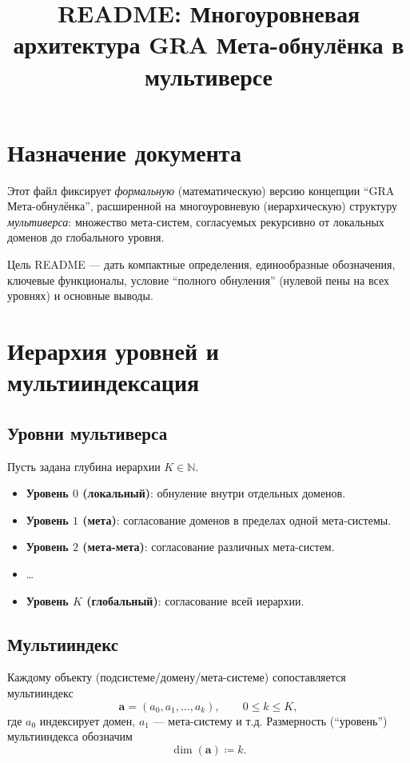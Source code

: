 \documentclass[11pt]{article}
\title{README: Многоуровневая архитектура GRA Мета-обнулёнка в мультиверсе}
\author{}
\date{}
\begin{document}
\maketitle

\section{Назначение документа}

Этот файл фиксирует \emph{формальную} (математическую) версию концепции ``GRA Мета-обнулёнка'', расширенной на многоуровневую (иерархическую) структуру \emph{мультиверса}: множество мета-систем, согласуемых рекурсивно от локальных доменов до глобального уровня.

Цель README --- дать компактные определения, единообразные обозначения, ключевые функционалы, условие ``полного обнуления'' (нулевой пены на всех уровнях) и основные выводы.

\section{Иерархия уровней и мультииндексация}

\subsection{Уровни мультиверса}

Пусть задана глубина иерархии $K\in\mathbb{N}$.

\begin{itemize}[leftmargin=*, itemsep=2pt]
  \item \textbf{Уровень $0$ (локальный)}: обнуление внутри отдельных доменов.
  \item \textbf{Уровень $1$ (мета)}: согласование доменов в пределах одной мета-системы.
  \item \textbf{Уровень $2$ (мета-мета)}: согласование различных мета-систем.
  \item \dots
  \item \textbf{Уровень $K$ (глобальный)}: согласование всей иерархии.
\end{itemize}

\subsection{Мультииндекс}

Каждому объекту (подсистеме/домену/мета-системе) сопоставляется мультииндекс
\[
\mathbf{a}=(a_0,a_1,\dots,a_k), \qquad 0\le k\le K,
\]
где $a_0$ индексирует домен, $a_1$ --- мета-систему и т.д. Размерность (``уровень'') мультииндекса обозначим
\[
\dim(\mathbf{a})\coloneqq k.
\]
\end{document}
